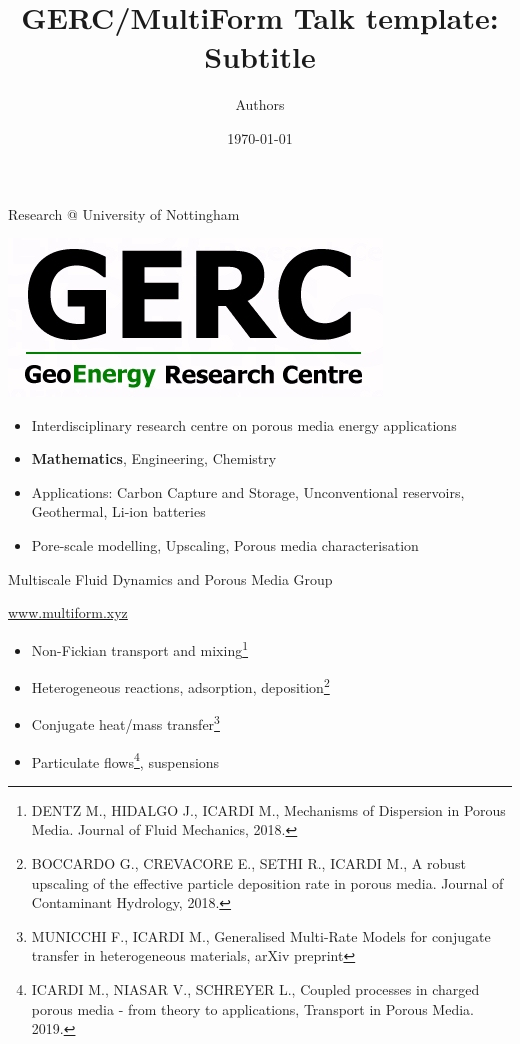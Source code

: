 \documentclass[aspectratio=43]{beamer}
\title[Shortened title]
{GERC/MultiForm Talk template:\\
{\smaller Subtitle}
}
\author[Shortened author names]{Authors}
\institute{University of Nottingham}
\date{\today}
\begin{document}
\begin{frame}
  \titlepage
\end{frame}


\begin{frame}{Research @ University of Nottingham}


{\begin{center}
\includegraphics[width=0.5\linewidth]{GERC-logo.jpg}
\end{center}
}


\begin{itemize}
\item Interdisciplinary research centre on porous media energy applications
\item \textbf{Mathematics}, Engineering, Chemistry
\item Applications: Carbon Capture and Storage, Unconventional reservoirs, Geothermal, Li-ion batteries
\item Pore-scale modelling, Upscaling, Porous media characterisation
\end{itemize}
\end{frame}



\begin{frame}{Multiscale Fluid Dynamics and Porous Media Group}{}
\begin{center}
{\Large
\url{www.multiform.xyz}
}
\end{center}

\begin{itemize}
\item Non-Fickian transport and mixing\footnote[frame]{DENTZ M., HIDALGO J., ICARDI M., Mechanisms of Dispersion in Porous Media. Journal of Fluid Mechanics, 2018.}
\item \alert{Heterogeneous reactions, adsorption, deposition}\footnote[frame]{BOCCARDO G., CREVACORE E., SETHI R., ICARDI M., A robust upscaling of the effective particle deposition rate in porous media. Journal of Contaminant Hydrology, 2018.}
\item Conjugate heat/mass transfer\footnote[frame]{MUNICCHI F., ICARDI M., Generalised Multi-Rate Models for conjugate transfer in heterogeneous materials, arXiv preprint}
\item Particulate flows\footnote[frame]{ICARDI M., NIASAR V., SCHREYER L., Coupled processes in charged porous media - from theory to applications, Transport in Porous Media. 2019.}, suspensions
\end{itemize}
\end{frame}
\end{document}
